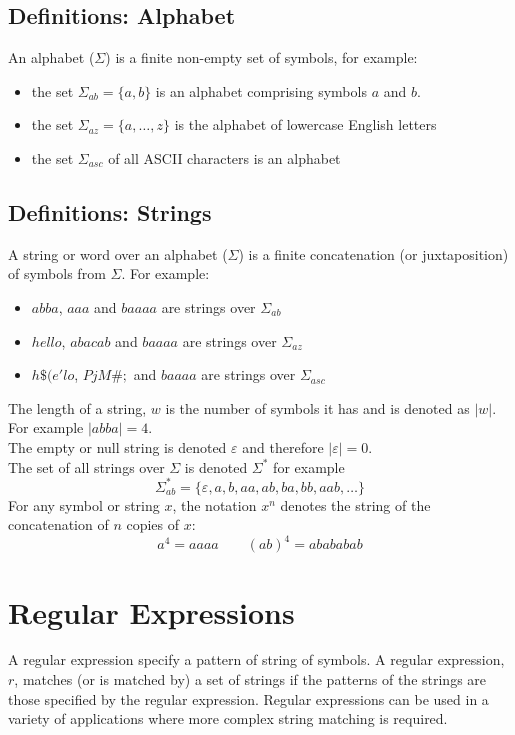 \subsection{Definitions: Alphabet}
An alphabet ($\Sigma$) is a finite non-empty set of symbols, for example:
\begin{itemize}
    \item the set $\Sigma_{ab} = \{a,b\}$ is an alphabet comprising symbols $a$ and $b$.
    \item the set $\Sigma_{az} = \{a,\ldots,z\}$ is the alphabet of lowercase English letters
    \item the set $\Sigma_{asc}$ of all ASCII characters is an alphabet
\end{itemize}
\subsection{Definitions: Strings}
A string or word over an alphabet ($\Sigma$) is a finite concatenation (or juxtaposition) of symbols from $\Sigma$. For example:
\begin{itemize}
    \item $abba$, $aaa$ and $baaaa$ are strings over $\Sigma_{ab}$
    \item $hello$, $abacab$ and $baaaa$ are strings over $\Sigma_{az}$
    \item $h\$(e'lo$, $PjM\#;$ and $baaaa$ are strings over $\Sigma_{asc}$
\end{itemize}
The length of a string, $w$ is the number of symbols it has and is denoted as $|w|$. For example $|abba|=4$.\\

The empty or null string is denoted  $\varepsilon$ and therefore $|\varepsilon| = 0$. \\

The set of all strings over $\Sigma$ is denoted $\Sigma^*$ for example
\[\Sigma^*_{ab} = \{\varepsilon, a, b, aa, ab, ba, bb, aab, \ldots\}\]
For any symbol or string $x$, the notation $x^n$ denotes the string of the concatenation of $n$ copies of $x$:
\[a^4 = aaaa \quad \quad (ab)^4 = abababab\]

\section{Regular Expressions}
A regular expression specify a pattern of string of symbols. A regular expression, $r$, matches (or is matched by) a set of strings if the patterns of the strings are those specified by the regular expression. Regular expressions can be used in a variety of applications where more complex string matching is required.\\

